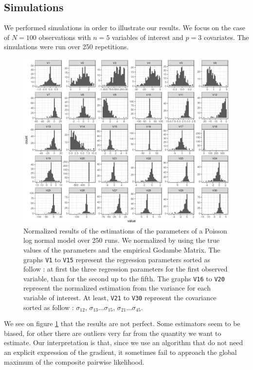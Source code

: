 \documentclass[11pt, a4paper]{article}
\begin{document}
\subsection{Simulations}
We performed simulations in order to illustrate our results. We focus on the case of $N=100$ observations with $n=5$ variables of interest and $p=3$ covariates. The simulations were run over 250 repetitions. 
\begin{figure}[!h] \label{plot}
\includegraphics[scale=0.7]{graph53_st_DIRETC_L.png}
\caption{Normalized results of the estimations of the parameters of a Poisson log normal model over 250 runs. We normalized by using the true values of the parameters and the empirical Godambe Matrix. The graphs \texttt{V1} to \texttt{V15} represent the regression parameters sorted as follow : at first the three regression parameters for the first observed variable, than for the second up to the fifth. The graphs \texttt{V16} to \texttt{V20} represent the normalized estimation from the variance for each variable of interest. At least, \texttt{V21} to \texttt{V30} represent the covariance sorted as follow : $\sigma_{12}$, $\sigma_{13}$...$\sigma_{15}$, $\sigma_{21}$...$\sigma_{45}$.}
\end{figure}

We see on figure \ref{plot} that the results are not perfect. Some estimators seem to be biased, for other there are outliers very far from the quantity we want to estimate. Our interpretation is that, since we use an algorithm that do not need an explicit expression of the gradient, it sometimes fail to approach the global maximum of the composite pairwise likelihood.
\end{document}
